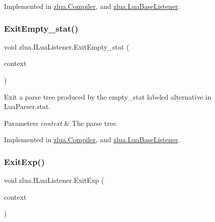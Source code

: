 Implemented in \mbox{\hyperlink{classzlua_1_1_compiler_aaad82853d1a4a26480b3ae56adbc58f6}{zlua.\+Compiler}}, and \mbox{\hyperlink{classzlua_1_1_lua_base_listener_acc7bef5cd55b204e258816f477397304}{zlua.\+Lua\+Base\+Listener}}.

\mbox{\label{interfacezlua_1_1_i_lua_listener_a5d6586f89158ceb4a9e683bbc2463ef3}} 
\subsubsection{\texorpdfstring{Exit\+Empty\+\_\+stat()}{ExitEmpty\_stat()}}
{\footnotesize\ttfamily void zlua.\+I\+Lua\+Listener.\+Exit\+Empty\+\_\+stat (\begin{DoxyParamCaption}\item[{\mbox{[}\+Not\+Null\mbox{]} \mbox{\hyperlink{classzlua_1_1_lua_parser_1_1_empty__stat_context}{Lua\+Parser.\+Empty\+\_\+stat\+Context}}}]{context }\end{DoxyParamCaption})}



Exit a parse tree produced by the {\ttfamily empty\+\_\+stat} labeled alternative in Lua\+Parser.\+stat. 


\begin{DoxyParams}{Parameters}
{\em context} & The parse tree.\\
\hline
\end{DoxyParams}


Implemented in \mbox{\hyperlink{classzlua_1_1_compiler_a6e35167b78ef83dd011df22f00c919a9}{zlua.\+Compiler}}, and \mbox{\hyperlink{classzlua_1_1_lua_base_listener_aa5d977c15c8fc410aa01cbff4372b873}{zlua.\+Lua\+Base\+Listener}}.

\mbox{\label{interfacezlua_1_1_i_lua_listener_adb4a861f691615f081c5910a78e507bd}} 
\subsubsection{\texorpdfstring{Exit\+Exp()}{ExitExp()}}
{\footnotesize\ttfamily void zlua.\+I\+Lua\+Listener.\+Exit\+Exp (\begin{DoxyParamCaption}\item[{\mbox{[}\+Not\+Null\mbox{]} \mbox{\hyperlink{classzlua_1_1_lua_parser_1_1_exp_context}{Lua\+Parser.\+Exp\+Context}}}]{context }\end{DoxyParamCaption})}



